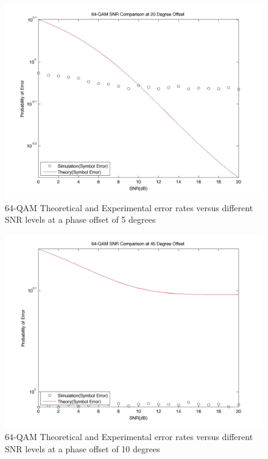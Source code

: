\documentclass[]{article}
\begin{document}
\begin{figure}[H]
\centering
\hspace*{-2cm}\includegraphics[width=1.3\textwidth]{qam64SNRpo3.jpg}
\caption{64-QAM Theoretical and Experimental error rates versus different SNR levels at a phase offset of 5 degrees }
\end{figure}

\begin{figure}[H]
\centering
\hspace*{-2cm}\includegraphics[width=1.3\textwidth]{qam64SNRpo4.jpg}
\caption{64-QAM Theoretical and Experimental error rates versus different SNR levels at a phase offset of 10 degrees }
\end{figure}
\end{document}
